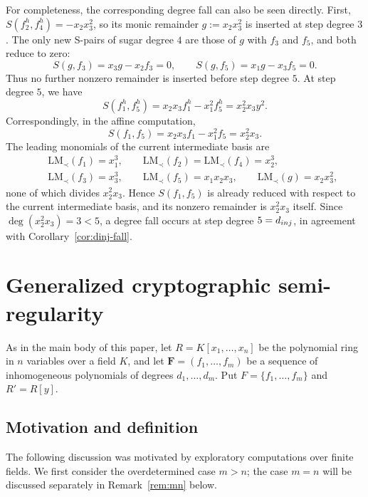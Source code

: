 \documentclass{article}
\theoremstyle{definition}
\theoremstyle{plain}
\theoremstyle{plain}
\theoremstyle{plain}
\theoremstyle{plain}
\numberwithin{equation}{subsection}
\begin{document}
For completeness, the corresponding degree fall can also be seen directly.
First, $S(f_2^h,f_4^h)=-x_2x_3^2$, so its monic remainder $g:=x_2x_3^2$ is inserted at step degree $3$.
The only new S-pairs of sugar degree $4$ are those of $g$ with $f_3$ and $f_5$, and both reduce to zero:
\[
S(g,f_3)=x_3g-x_2f_3=0,\qquad S(g,f_5)=x_1g-x_3f_5=0.
\]
Thus no further nonzero remainder is inserted before step degree $5$.
At step degree $5$, we have
\[
S(f_1^h,f_5^h) = x_2x_3f_1^h-x_1^2f_5^h = x_2^2x_3y^2.
\]
Correspondingly, in the affine computation,
\[
S(f_1,f_5)=x_2x_3f_1-x_1^2f_5=x_2^2x_3.
\]
The leading monomials of the current intermediate basis are
\begin{eqnarray*}
&& \mathrm{LM}_{\prec} (f_1)= x_1^3,\qquad \mathrm{LM}_{\prec} (f_2)=\mathrm{LM}_{\prec} (f_4)=x_2^3,\\
&& \mathrm{LM}_{\prec} (f_3)=x_3^3,\qquad \mathrm{LM}_{\prec} (f_5)=x_1x_2x_3,\qquad \mathrm{LM}_{\prec} (g)=x_2x_3^2,
\end{eqnarray*}
none of which divides $x_2^2x_3$.
Hence $S(f_1,f_5)$ is already reduced with respect to the current intermediate basis, and its nonzero remainder is $x_2^2x_3$ itself.
Since $ \deg(x_2^2x_3)=3<5$, a degree fall occurs at step degree $5=d_{\rm inj}$, in agreement with Corollary~\ref{cor:dinj-fall}.

\def\thesection{Appendix \Alph{section}}
\section{Generalized cryptographic semi-regularity}\label{app:gen}
\def\thesection{\Alph{section}}

As in the main body of this paper, let $R=K[x_1,\ldots,x_n]$ be the polynomial ring in $n$ variables over a field $K$, and let $\bm F=(f_1,\ldots,f_m)$ be a sequence of inhomogeneous polynomials of degrees $d_1,\ldots,d_m$.
Put $F=\{f_1,\ldots,f_m\}$ and $R'=R[y]$.

\subsection{Motivation and definition}

The following discussion was motivated by exploratory computations over finite fields.
We first consider the overdetermined case $m>n$; the case $m=n$ will be discussed separately in Remark~\ref{rem:mn} below.
\end{document}
